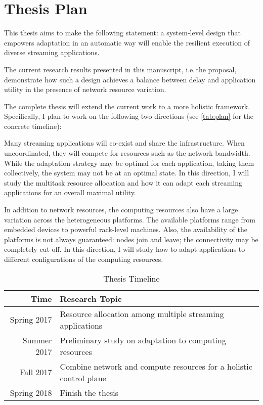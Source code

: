 \chapter{Thesis Plan}
\label{cha:thesis-plan}

This thesis aims to make the following statement: a system-level design that
empowers adaptation in an automatic way will enable the resilient execution of
diverse streaming applications.

The current research results presented in this manuscript, i.e.\,the proposal,
demonstrate how such a design achieves a balance between delay and application
utility in the presence of network resource variation.

The complete thesis will extend the current work to a more holistic framework.
Specifically, I plan to work on the following two directions (see
\autoref{tab:plan} for the concrete timeline):

 Many streaming applications will co-exist
and share the infrastructure. When uncoordinated, they will compete for
resources such as the network bandwidth. While the adaptation strategy may be
optimal for each application, taking them collectively, the system may not be at
an optimal state. In this direction, I will study the multitask resource
allocation and how it can adapt each streaming applications for an overall
maximal utility.

 In addition to network resources, the
computing resources also have a large variation across the heterogeneous
platforms. The available platforms range from embedded devices to powerful
rack-level machines. Also, the availability of the platforms is not always
guaranteed: nodes join and leave; the connectivity may be completely cut off. In
this direction, I will study how to adapt applications to different
configurations of the computing resources.

\vspace{1.5em}
\begin{table}[h]
  \normalsize
  \centering
  \begin{tabular}{r l}
    \toprule
    \textbf{Time} & \textbf{Research Topic} \\
    \midrule
    Spring 2017 & Resource allocation among multiple streaming applications \\
    Summer 2017 & Preliminary study on adaptation to computing resources \\
    Fall 2017 & Combine network and compute resources for a holistic control plane \\
    Spring 2018 &  Finish the thesis \\
    \bottomrule
  \end{tabular}
  \caption{Thesis Timeline}
  \label{tab:plan}
\end{table}

